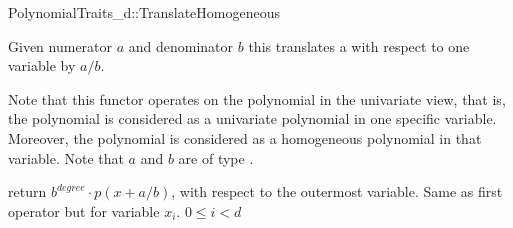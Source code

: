 \begin{ccRefConcept}{PolynomialTraits_d::TranslateHomogeneous}
\ccDefinition

Given numerator $a$ and denominator $b$ this  translates a 
 with respect to one variable by $a/b$. 

Note that this functor operates on the polynomial in the univariate view, that is, 
the polynomial is considered as a univariate polynomial in one specific variable. 
Moreover, the polynomial is considered as a homogeneous polynomial in that variable.
Note that $a$ and $b$ are of type .


\ccRefines 
{}

\ccTypes

\ccGlue

\ccOperations
{}
         { return $b^{degree}\cdot p(x+a/b)$, with respect to the outermost variable. }
         { Same as first operator but for variable $x_i$.
           \ccPrecond $0 \leq i  < d$ 
         }


\ccSeeAlso

\\
\\

\end{ccRefConcept}
